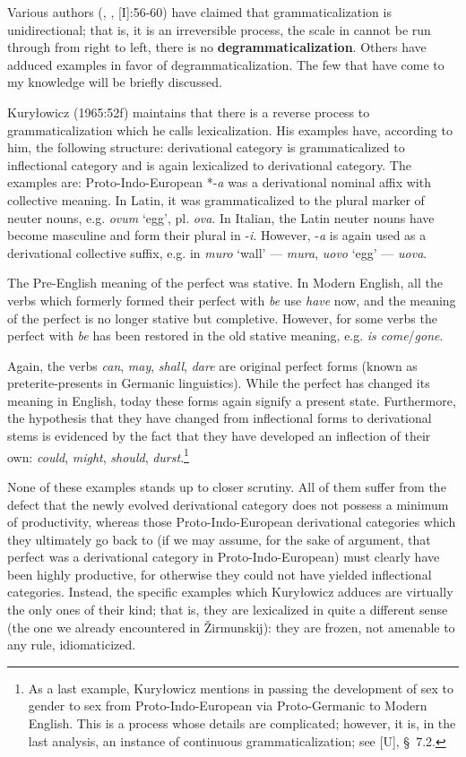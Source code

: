 Various authors (\citet[96]{Givón1975}, \citet[103f]{Langacker1977}, \citet{Vincent1980}[I]:56-60) have claimed that grammaticalization is unidirectional; that is, it is an irreversible process, the scale in  cannot be run through from right to left, there is no \textbf{degrammaticalization}. Others have adduced examples in favor of degrammaticalization. The few that have come to my knowledge will be briefly discussed.

Kuryłowicz (1965:52f) maintains that there is a reverse process to grammaticalization which he calls lexicalization. His examples have, according to him, the following structure: derivational category is grammaticalized to inflectional category and is again lexicalized to derivational category. The examples are: Proto-Indo-European *-\textit{a} was a derivational nominal affix with collective meaning. In Latin, it was grammaticalized to the plural marker of neuter nouns, e.g. \textit{ovum} ‘egg’, pl. \textit{ova}. In Italian, the Latin neuter nouns have become masculine and form their plural in -\textit{i}. However, -\textit{a} is again used as a derivational collective suffix, e.g. in \textit{muro} ‘wall’ — \textit{mura}, \textit{uovo} ‘egg’ — \textit{uova}.

The Pre-English meaning of the perfect was stative. In Modern English, all the verbs which formerly formed their perfect with \textit{be} use \textit{have} now, and the meaning of the perfect is no longer stative but completive. However, for some verbs the perfect with \textit{be} has been restored in the old stative meaning, e.g. \textit{is come}/\textit{gone}.

Again, the verbs \textit{can}, \textit{may}, \textit{shall}, \textit{dare} are original perfect forms (known as preterite-presents in Germanic linguistics). While the perfect has changed its meaning in English, today these forms again signify a present state. Furthermore, the hypothesis that they have changed from inflectional forms to derivational stems is evidenced by the fact that they have developed an inflection of their own: \textit{could}, \textit{might}, \textit{should}, \textit{durst}.\footnote{As a last example, Kuryłowicz mentions in passing the development of sex to gender to sex from Proto-Indo-European via Proto-Germanic to Modern English. This is a process whose details are complicated; however, it is, in the last analysis, an instance of continuous grammaticalization; see \citet{Lehmann1982}[U], §~7.2.}

None of these examples stands up to closer scrutiny. All of them suffer from the defect that the newly evolved derivational category does not possess a minimum of productivity, whereas those Proto-Indo-European derivational categories which they ultimately go back to (if we may assume, for the sake of argument, that perfect was a derivational category in Proto-Indo-European) must clearly have been highly productive, for otherwise they could not have yielded inflectional categories. Instead, the specific examples which Kuryłowicz adduces are virtually the only ones of their kind; that is, they are lexicalized in quite a different sense (the one we already encountered in Žirmunskij): they are frozen, not amenable to any rule, idiomaticized.

